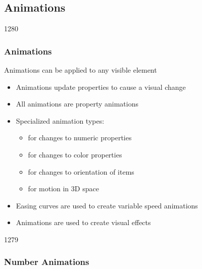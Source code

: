 %
%
%
%

\subsection{Animations}
\begin{slide}{1280}\frametitle{Animations}

Animations can be applied to any visible element

\begin{itemize}
\item Animations update properties to cause a visual change
\item All animations are property animations
\item Specialized animation types:
  \begin{itemize}
  \item {} for changes to numeric properties
  \item {} for changes to color properties
  \item {} for changes to orientation of items
  \item {} for motion in 3D space
  \end{itemize}
\item Easing curves are used to create variable speed animations
\item Animations are used to create visual effects
\end{itemize}

\end{slide}


\begin{slide}{1279}\frametitle{Number Animations}

                                   
\end{slide}

